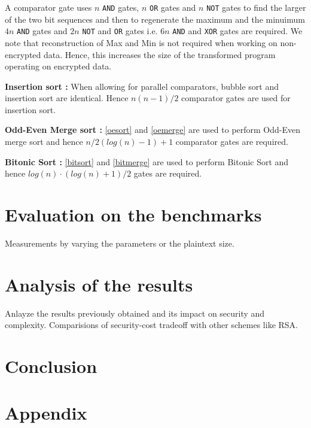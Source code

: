 \documentclass{acm_proc_article-sp}
\begin{document}
A comparator gate uses $n$ \texttt{AND} gates, $n$ \texttt{OR} gates and $n$ \texttt{NOT} gates to find the larger of the two bit sequences and then to regenerate the maximum and the minuimum $4n$ \texttt{AND} gates and $2n$ \texttt{NOT} and \texttt{OR} gates i.e. $6n$ \texttt{AND} and \texttt{XOR} gates are required. We note that reconstruction of Max and  Min is not required when working on non-encrypted data. Hence, this increases the size of the transformed program operating on encrypted data.

\textbf{Insertion sort :} When allowing for parallel comparators, bubble sort and insertion sort are identical. Hence $n(n-1)/2$ comparator gates are used for insertion sort.

\textbf{Odd-Even Merge sort :} \autoref{oesort} and \autoref{oemerge} are used to perform Odd-Even merge sort and hence  $n/2(log(n)-1) + 1 $ comparator gates are required. 


\textbf{Bitonic Sort :} \autoref{bitsort} and \autoref{bitmerge} are used to perform Bitonic Sort and hence $log(n) · (log(n)+1) / 2 $ gates are required.


\lstset{                                    %
  language=C,
  frame=lines,
  captionpos=b
 }


\renewcommand{\lstlistingname}{Code}

\section{Evaluation on the benchmarks}
Measurements by varying the parameters or the plaintext size.
\section{Analysis of the results}

Anlayze the results previously obtained and its impact on security and complexity. Comparisions of security-cost tradeoff with other schemes like RSA.
\section{Conclusion}




  

\section{Appendix}
\end{document}
